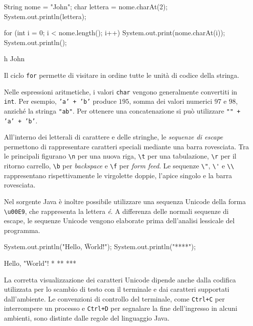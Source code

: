 \begin{unipdcode}[language=Java]
String nome = "John";
char lettera = nome.charAt(2);
System.out.println(lettera);

for (int i = 0; i < nome.length(); i++) {
    System.out.print(nome.charAt(i));
}
System.out.println();
\end{unipdcode}

\begin{unipdterminal}
h
John
\end{unipdterminal}

Il ciclo \texttt{for} permette di visitare in ordine
tutte le unità di codice della stringa.

Nelle espressioni aritmetiche, i valori \texttt{char}
vengono generalmente convertiti in \texttt{int}.
Per esempio, \texttt{'a' + 'b'} produce \(195\),
somma dei valori numerici \(97\) e \(98\),
anziché la stringa \texttt{"ab"}. Per ottenere
una concatenazione si può utilizzare
\texttt{"" + 'a' + 'b'}.

All'interno dei letterali di carattere e delle stringhe,
le \emph{sequenze di escape} permettono di rappresentare
caratteri speciali mediante una barra rovesciata.
Tra le principali figurano \lstinline|\n| per una
nuova riga, \lstinline|\t| per una tabulazione,
\lstinline|\r| per il ritorno carrello,
\lstinline|\b| per \emph{backspace} e
\lstinline|\f| per \emph{form feed}.
Le sequenze \lstinline|\"|, \lstinline|\'| e
\lstinline|\\| rappresentano rispettivamente
le virgolette doppie, l'apice singolo e la
barra rovesciata.

Nel sorgente Java è inoltre possibile utilizzare
una sequenza Unicode della forma \lstinline|\u00E9|,
che rappresenta la lettera \emph{é}. A differenza
delle normali sequenze di escape, le sequenze
Unicode vengono elaborate prima dell'analisi
lessicale del programma.

\begin{unipdcode}[language=Java]
System.out.println("Hello, \"World\"!");
System.out.println("*\n**\n***");
\end{unipdcode}

\begin{unipdterminal}
Hello, "World"!
*
**
***
\end{unipdterminal}

La corretta visualizzazione dei caratteri Unicode
dipende anche dalla codifica utilizzata per lo scambio
di testo con il terminale e dai caratteri supportati
dall'ambiente. Le convenzioni di controllo del terminale,
come \texttt{Ctrl+C} per interrompere un processo e
\texttt{Ctrl+D} per segnalare la fine dell'ingresso
in alcuni ambienti, sono distinte dalle regole
del linguaggio Java.

